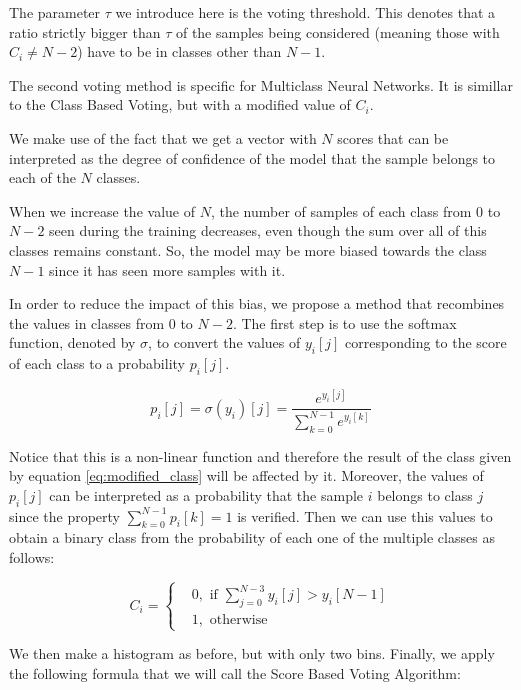 The parameter $\tau$ we introduce here is the voting threshold.
This denotes that a ratio strictly bigger than $\tau$ of the samples being considered (meaning those with $C_i \neq N-2$) have to be in classes other than $N-1$.

The second voting method is specific for Multiclass Neural Networks.
It is simillar to the Class Based Voting, but with a modified value of $C_i$.

We make use of the fact that we get a vector with $N$ scores that can be interpreted as the degree of confidence of the model that the sample belongs to each of the $N$ classes.

When we increase the value of $N$, the number of samples of each class from $0$ to $N-2$ seen during the training decreases, even though the sum over all of this classes remains constant.
So, the model may be more biased towards the class $N-1$ since it has seen more samples with it.

In order to reduce the impact of this bias, we propose a method that recombines the values in classes from $0$ to $N-2$.
The first step is to use the softmax function, denoted by $\sigma$, to convert the values of $y_i[j]$ corresponding to the score of each class to a probability $p_i[j]$.

\begin{equation}
  p_i[j] = \sigma(y_i)[j] = \dfrac{e^{y_i[j]}}{\sum_{k=0}^{N-1}e^{y_i[k]}}
\end{equation}

Notice that this is a non-linear function and therefore the result of the class given by equation \ref{eq:modified_class} will be affected by it.
Moreover, the values of $p_i[j]$ can be interpreted as a probability that the sample $i$ belongs to class $j$ since the property $\sum_{k=0}^{N-1}p_i[k] = 1$ is verified. 
Then we can use this values to obtain a binary class from the probability of each one of the multiple classes as follows:

\begin{equation}\label{eq:modified_class}
  C_i = 
  \begin{cases}
    & 0, \text{ if } \sum_{j=0}^{N-3} y_i[j] > y_i[N-1] \\
    & 1, \text{ otherwise}
  \end{cases}
\end{equation}

We then make a histogram as before, but with only two bins.
Finally, we apply the following formula that we will call the Score Based Voting Algorithm:

